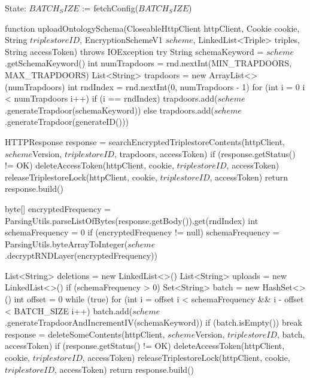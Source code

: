 State:
    $BATCH_SIZE$ := fetchConfig($BATCH_SIZE$)



function uploadOntologySchema(CloseableHttpClient httpClient, Cookie cookie,
                                          String $triplestoreID$, EncryptionSchemeV1 $scheme$, LinkedList<Triple> triples,
                                          String accessToken) throws IOException 
        try 
            String schemaKeyword = $scheme$.getSchemaKeyword()
            int numTrapdoors = rnd.nextInt(MIN_TRAPDOORS, MAX_TRAPDOORS)
            List<String> trapdoors = new ArrayList<>(numTrapdoors)
            int rndIndex = rnd.nextInt(0, numTrapdoors - 1)
            for (int i = 0 i < numTrapdoors i++) 
                if (i == rndIndex)
                    trapdoors.add($scheme$.generateTrapdoor(schemaKeyword))
                else
                    trapdoors.add($scheme$.generateTrapdoor(generateID()))
            
            HTTPResponse response = searchEncryptedTriplestoreContents(httpClient, $scheme$Version, $triplestoreID$, trapdoors, accessToken)
            if (response.getStatus() != OK) 
                deleteAccessToken(httpClient, cookie, $triplestoreID$, accessToken)
                releaseTriplestoreLock(httpClient, cookie, $triplestoreID$, accessToken)
                return response.build()
            
            byte[] encryptedFrequency = ParsingUtils.parseListOfBytes(response.getBody()).get(rndIndex)
            int schemaFrequency = 0
            if (encryptedFrequency != null)
                schemaFrequency = ParsingUtils.byteArrayToInteger($scheme$.decryptRNDLayer(encryptedFrequency))

            List<String> deletions = new LinkedList<>()
            List<String> uploads = new LinkedList<>()
            if (schemaFrequency > 0) 
                Set<String> batch = new HashSet<>()
                int offset = 0
                while (true) 
                    for (int i = offset i < schemaFrequency && i - offset < BATCH_SIZE i++)
                        batch.add($scheme$.generateTrapdoorAndIncrementIV(schemaKeyword))
                    if (batch.isEmpty())
                        break
                    response = deleteSomeContents(httpClient, $scheme$Version, $triplestoreID$, batch, accessToken)
                    if (response.getStatus() != OK) 
                        deleteAccessToken(httpClient, cookie, $triplestoreID$, accessToken)
                        releaseTriplestoreLock(httpClient, cookie, $triplestoreID$, accessToken)
                        return response.build()
                    
